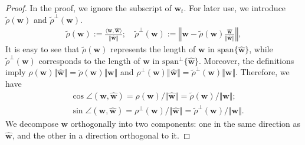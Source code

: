 \documentclass[pdflatex,sn-basic]{sn-jnl}%
\theoremstyle{thmstyleone}%
\begin{document}
\begin{appendices}
\begin{shaded}
\begin{restate_logit_bound}
\end{restate_logit_bound}
\end{shaded}
\begin{proof}
  In the proof, we ignore the subscript of $\mathbf{w}_t$. 
  For later use, we introduce $\tilde{\rho} \left(\mathbf{w}\right)$
  and $\tilde{\rho}^{\perp} \left(\mathbf{w}\right)$. 
  \begin{equation*}
  \begin{aligned}
    \tilde{{\rho}}(\mathbf{w}) := \frac{\langle \mathbf{w}, \hat{\mathbf{w}} \rangle}{\Vert \hat{\mathbf{w}} \Vert};
    \quad
    \tilde{{\rho}}^{\perp}(\mathbf{w}) := 
    \left\Vert {\mathbf{w}} - \tilde{\rho}(\mathbf{w}) \frac{\hat{\mathbf{w}}}{\Vert \hat{\mathbf{w}} \Vert} \right\Vert,
  \end{aligned}
  \end{equation*}
  It is easy to see that $\tilde{\rho}(\mathbf{w})$ represents the length of $\mathbf{w}$ in $\text{span} \{\hat{\mathbf{w}}\}$, 
  while $\tilde{\rho}^{\perp}(\mathbf{w})$ corresponds to the length of $\mathbf{w}$ in $\text{span}^{\perp} \{\hat{\mathbf{w}}\}$. 
  Moreover, the definitions imply
  $\rho(\mathbf{w}) \Vert \hat{\mathbf{w}} \Vert = \tilde{\rho}(\mathbf{w}) \Vert \mathbf{w} \Vert$
  and
  $\rho^{\perp}(\mathbf{w}) \Vert \hat{\mathbf{w}} \Vert = \tilde{\rho}^{\perp}(\mathbf{w}) \Vert \mathbf{w} \Vert$.
  Therefore, we have 
  \begin{equation*}
  \begin{aligned}
    & \cos \angle \left(\mathbf{w},  \hat{\mathbf{w}}\right) 
    = 
    {\rho}(\mathbf{w}) / \Vert \hat{\mathbf{w}} \Vert 
    =
    {\tilde{\rho}}(\mathbf{w}) / \Vert {\mathbf{w}} \Vert;
    \\ &
    \sin \angle \left(\mathbf{w},  \hat{\mathbf{w}}\right) 
    = {\rho}^{\perp}(\mathbf{w}) / \Vert \hat{\mathbf{w}} \Vert
    =
    \tilde{{\rho}}^{\perp}(\mathbf{w}) / \Vert {\mathbf{w}} \Vert.
  \end{aligned}
  \end{equation*}
  We decompose $\mathbf{w}$ orthogonally into two components: one in the same direction as $\hat{\mathbf{w}}$, and the other in a direction orthogonal to it. 

\end{proof}
\end{appendices}
\end{document}
